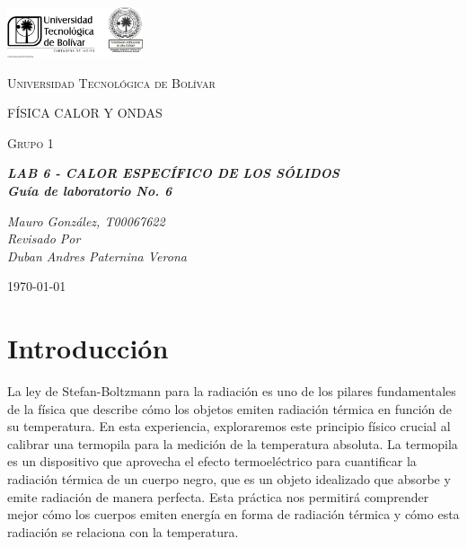 \documentclass[twocolumn, 12pt]{article}
\begin{document}
\begin{titlepage}
    \centering
    \includegraphics[width=0.3\textwidth]{Images/logo_utb.png}\par\vspace{1cm}
    {\scshape\LARGE Universidad Tecnológica de Bolívar \par}
    \vspace{1cm}

    {\scshape\Large FÍSICA CALOR Y ONDAS \par}
    \vspace{.2cm}

    {\scshape\Large Grupo 1 \par}
    \vspace{1cm}
    \slshape {\Large \bfseries{}LAB 6 - CALOR ESPECÍFICO DE LOS SÓLIDOS\\}
    \slshape {\small \bfseries{} Guía de laboratorio No. 6}
    \vspace{4cm}

    \slshape {\itshape{} Mauro González, T00067622 \\}
    \vfill
    Revisado Por \\
    Duban Andres Paternina Verona\\
    {\large \today\par}
\end{titlepage}

\section{Introducción}

La ley de Stefan-Boltzmann para la radiación es uno de los
pilares fundamentales de la física que describe cómo los
objetos emiten radiación térmica en función de su
temperatura. En esta experiencia, exploraremos este
principio físico crucial al calibrar una termopila para la
medición de la temperatura absoluta. La termopila es un
dispositivo que aprovecha el efecto termoeléctrico para
cuantificar la radiación térmica de un cuerpo negro, que es
un objeto idealizado que absorbe y emite radiación de
manera perfecta. Esta práctica nos permitirá comprender
mejor cómo los cuerpos emiten energía en forma de radiación
térmica y cómo esta radiación se relaciona con la
temperatura.
\end{document}
